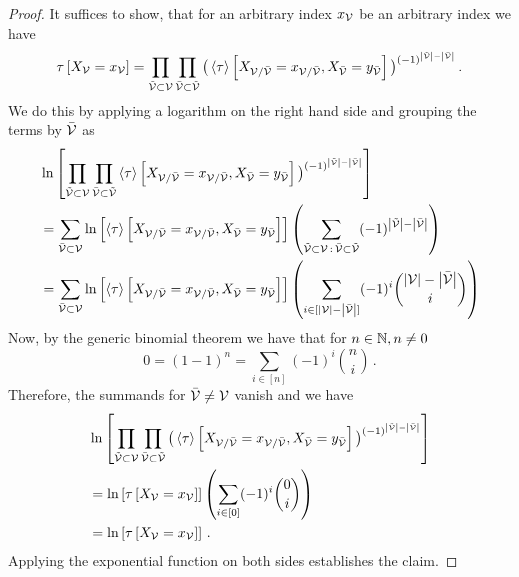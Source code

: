 \begin{proof}
    It suffices to show, that for an arbitrary index $x_{\mathcal{V}}$ be an arbitrary index we have
    \begin{align*}
        \tau\left[X_{\mathcal{V}}=x_{\mathcal{V}}\right]
        = \prod_{\tilde{\mathcal{V}}\subset\mathcal{V}} \prod_{\bar{\mathcal{V}}\subset\tilde{\mathcal{V}}}
        \big(\left\langle \tau\right\rangle \left[ X_{\mathcal{V}/\bar{\mathcal{V}}}=x_{\mathcal{V}/\bar{\mathcal{V}}}, X_{\bar{\mathcal{V}}} = y_{\bar{\mathcal{V}}} \right]\big)^{(-1)^{\left|\tilde{\mathcal{V}}\right|-\left|\bar{\mathcal{V}}\right|}} \, .
    \end{align*}
    We do this by applying a logarithm on the right hand side and grouping the terms by $\bar{\mathcal{V}}$ as
    \begin{align*}
        & \ln \left[ \prod_{\tilde{\mathcal{V}}\subset\mathcal{V}} \prod_{\bar{\mathcal{V}}\subset\tilde{\mathcal{V}}}
            \left\langle \tau\right\rangle \left[ X_{\mathcal{V}/\bar{\mathcal{V}}}=x_{\mathcal{V}/\bar{\mathcal{V}}}, X_{\bar{\mathcal{V}}} = y_{\bar{\mathcal{V}}} \right]\big)^{(-1)^{\left|\tilde{\mathcal{V}}\right|-\left|\bar{\mathcal{V}}\right|}} \right] \\
        & = \sum_{\bar{\mathcal{V}}\subset\mathcal{V}} \ln \left[ \left\langle \tau\right\rangle \left[ X_{\mathcal{V}/\bar{\mathcal{V}}}=x_{\mathcal{V}/\bar{\mathcal{V}}}, X_{\bar{\mathcal{V}}} = y_{\bar{\mathcal{V}}} \right] \right]
        \left( \sum_{\tilde{\mathcal{V}}\subset\mathcal{V} \, : \, \bar{\mathcal{V}}\subset \tilde{\mathcal{V}}} (-1)^{\left|\tilde{\mathcal{V}}\right|-\left|\bar{\mathcal{V}}\right|} \right) \\
        & =  \sum_{\bar{\mathcal{V}}\subset\mathcal{V}} \ln \left[ \left\langle \tau\right\rangle \left[ X_{\mathcal{V}/\bar{\mathcal{V}}}=x_{\mathcal{V}/\bar{\mathcal{V}}}, X_{\bar{\mathcal{V}}} = y_{\bar{\mathcal{V}}} \right] \right]
        \left( \sum_{i \in [\left|\mathcal{V}\right|-\left|\bar{\mathcal{V}}\right|]}  (-1)^{i}  \binom{\left|\mathcal{V}\right|-\left|\bar{\mathcal{V}}\right|}{i}  \right)
    \end{align*}
    Now, by the generic binomial theorem we have that for $n\in\mathbb{N}, n \neq 0$
    \[ 0 = (1-1)^n = \sum_{i \in [n]}  (-1)^{i}  \binom{n}{i}   \, . \]
    Therefore, the summands for $\bar{\mathcal{V}}\neq\mathcal{V}$ vanish and we have
    \begin{align*}
        & \ln \left[  \prod_{\tilde{\mathcal{V}}\subset\mathcal{V}} \prod_{\bar{\mathcal{V}}\subset\tilde{\mathcal{V}}}
            \big(\left\langle \tau\right\rangle \left[ X_{\mathcal{V}/\bar{\mathcal{V}}}=x_{\mathcal{V}/\bar{\mathcal{V}}}, X_{\bar{\mathcal{V}}} = y_{\bar{\mathcal{V}}} \right]\big)^{(-1)^{\left|\tilde{\mathcal{V}}\right|-\left|\bar{\mathcal{V}}\right|}}  \right] \\
        & = \ln \left[ \tau\left[X_{\mathcal{V}}=x_{\mathcal{V}}\right] \right]
        \left( \sum_{i \in [0]}  (-1)^{i}  \binom{0}{i}  \right) \\
        & = \ln \left[ \tau\left[X_{\mathcal{V}}=x_{\mathcal{V}}\right] \right] \, .
    \end{align*}
    Applying the exponential function on both sides establishes the claim.
\end{proof}

